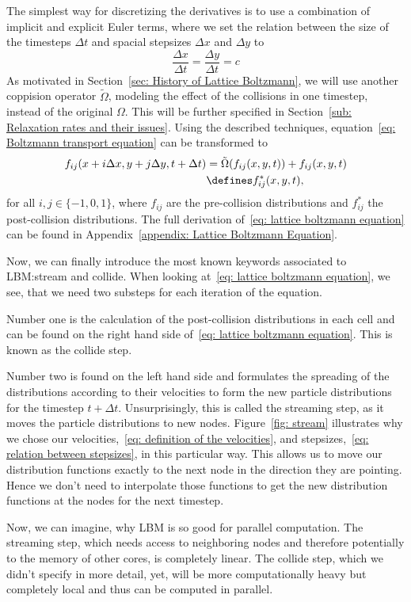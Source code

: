 The simplest way for discretizing the derivatives is to use a combination of implicit and explicit Euler terms, where we set the relation between the size of the timesteps $\Delta t$ and spacial stepsizes $\Delta x$ and $\Delta y$ to
\begin{equation}
  \label{eq: relation between stepsizes}
  \frac{\Delta x} {\Delta{t}} = \frac{\Delta y} {\Delta{t}} = c
\end{equation}
As motivated in Section~\ref{sec: History of Lattice Boltzmann}, we will use another coppision operator $\tilde{\Omega}$, modeling the effect of the collisions in one timestep, instead of the original $\Omega$. This will be further specified in Section~\ref{sub: Relaxation rates and their issues}.
Using the described techniques, equation~\eqref{eq: Boltzmann transport equation} can be transformed to
\begin{equation}
  \label{eq: lattice boltzmann equation}
  \begin{aligned}
    f_{ij}(x + i \Delta x , y + j \Delta y,t + \Delta t)
    &= \tilde{\Omega}(f_{ij}(x,y,t))
    + f_{ij}(x,y,t)
    \\&
    \defines f_{ij}^*(x, y, t),
  \end{aligned}
\end{equation}
for all $i,j\in \{-1, 0, 1\}$, where $f_{ij}$ are the pre-collision distributions and $f_{ij}^*$ the post-collision distributions.
The full derivation of~\eqref{eq: lattice boltzmann equation} can be found in Appendix~\ref{appendix: Lattice Boltzmann Equation}.

Now, we can finally introduce the most known keywords associated to LBM:\@ stream and collide.
When looking at~\eqref{eq: lattice boltzmann equation}, we see, that we need two substeps for each iteration of the equation.

Number one is the calculation of the post-collision distributions in each cell and can be found on the right hand side of~\eqref{eq: lattice boltzmann equation}. This is known as the collide step.

Number two is found on the left hand side and formulates the spreading of the distributions according to their velocities to form the new particle distributions for the timestep $t+\Delta t$.
Unsurprisingly, this is called the streaming step, as it moves the particle distributions to new nodes.
Figure~\ref{fig: stream} illustrates why we chose our velocities,~\eqref{eq: definition of the velocities}, and stepsizes,~\eqref{eq: relation between stepsizes}, in this particular way.
This allows us to move our distribution functions exactly to the next node in the direction they are pointing. Hence we don't need to interpolate those functions to get the new distribution functions at the nodes for the next timestep.

Now, we can imagine, why LBM is so good for parallel computation.
The streaming step, which needs access to neighboring nodes and therefore potentially to the memory of other cores, is completely linear.
The collide step, which we didn't specify in more detail, yet, will be more computationally heavy but completely local and thus can be computed in parallel.
